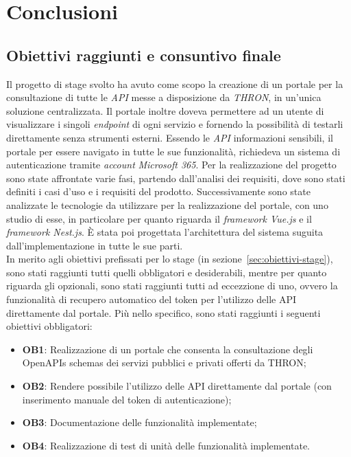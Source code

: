 \chapter{Conclusioni}\label{cap:conclusioni}


\section{Obiettivi raggiunti e consuntivo finale}
Il progetto di stage svolto ha avuto come scopo la creazione di un portale per la consultazione di tutte le \textit{API} messe a disposizione da \textit{THRON}, in un'unica soluzione centralizzata. 
Il portale inoltre doveva permettere ad un utente di visualizzare i singoli \textit{endpoint} di ogni servizio e fornendo la possibilità di testarli direttamente senza strumenti esterni.
Essendo le \textit{API} informazioni sensibili, il portale per essere navigato in tutte le sue funzionalità, richiedeva un sistema di autenticazione tramite \textit{account} \textit{Microsoft 365}.
Per la realizzazione del progetto sono state affrontate varie fasi, partendo dall'analisi dei requisiti, dove sono stati definiti i casi d'uso e i requisiti del prodotto.
Successivamente sono state analizzate le tecnologie da utilizzare per la realizzazione del portale, con uno studio di esse, in particolare per quanto riguarda il \textit{framework Vue.js} e il \textit{framework Nest.js}.
È stata poi progettata l'architettura del sistema suguita dall'implementazione in tutte le sue parti.\\

In merito agli obiettivi prefissati per lo stage (in sezione~\ref{sec:obiettivi-stage}), sono stati raggiunti tutti quelli obbligatori e desiderabili, mentre per quanto riguarda gli opzionali, sono stati raggiunti tutti ad eccezzione di uno, ovvero la funzionalità di recupero automatico del token per l'utilizzo delle API direttamente dal portale.
Più nello specifico, sono stati raggiunti i seguenti obiettivi obbligatori:
\begin{itemize}
  \item \textbf{OB1}: Realizzazione di un portale che consenta la consultazione degli OpenAPIs schemas dei servizi pubblici e privati offerti da THRON;
  \item \textbf{OB2}: Rendere possibile l'utilizzo delle API direttamente dal portale (con inserimento manuale del token di autenticazione);
  \item \textbf{OB3}: Documentazione delle funzionalità implementate;
  \item \textbf{OB4}: Realizzazione di test di unità delle funzionalità implementate.
\end{itemize}

